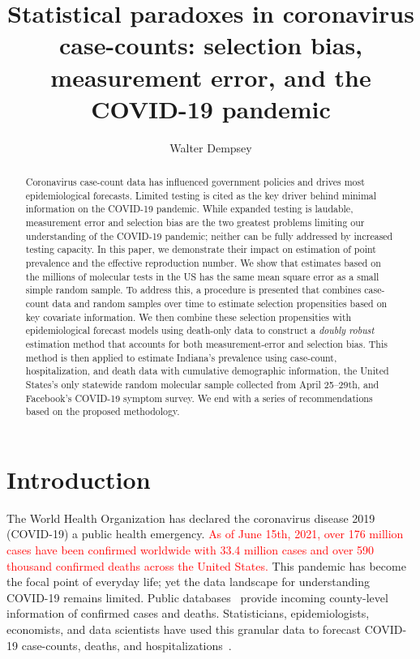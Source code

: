 \documentclass[11pt]{amsart}
\numberwithin{equation}{section}
\theoremstyle{plain}
\begin{document}
\title[Statistical paradoxes in coronavirus case-counts]{Statistical paradoxes in coronavirus case-counts: selection bias, measurement error, and the COVID-19 pandemic} %

\author{Walter Dempsey}
\address{Department of Biostatistics, University of Michigan, Ann Arbor, MI 48109}

\begin{abstract}
  Coronavirus case-count data has influenced government policies and drives most epidemiological forecasts. Limited testing is cited as the key driver behind minimal information on the COVID-19 pandemic. While expanded testing is laudable, measurement error and selection bias are the two greatest problems limiting our understanding of the COVID-19 pandemic; neither can be fully addressed by increased testing capacity. In this paper, we demonstrate their impact on estimation of point prevalence and the effective reproduction number. We show that estimates based on the millions of molecular tests in the US has the same mean square error as a small simple random sample.  To address this, a procedure is presented that combines case-count data and random samples over time to estimate selection propensities based on key covariate information. We then combine these selection propensities with epidemiological forecast models using death-only data to construct a \emph{doubly robust} estimation method that accounts for both measurement-error and selection bias.  This method is then applied to estimate Indiana's prevalence using case-count, hospitalization, and death data with cumulative demographic information, the United States's only statewide random molecular sample collected from April 25--29th, and Facebook's COVID-19 symptom survey.  We end with a series of recommendations based on the proposed methodology.
\end{abstract}

\maketitle

\newpage


\section{Introduction}
The World Health Organization has declared the coronavirus disease 2019 (COVID-19) a public health emergency.  \textcolor{red}{As of June 15th, 2021, over 176 million cases have been confirmed worldwide with 33.4 million cases and over 590 thousand confirmed deaths across the United States.} This pandemic
has become the focal point of everyday life; yet the data landscape for understanding COVID-19 remains limited.  Public databases~\citep{JHU_Lancet,NYT} provide incoming county-level information of confirmed cases and deaths.  Statisticians, epidemiologists, economists, and data scientists have used this granular data to forecast COVID-19 case-counts, deaths, and hospitalizations~\citep{Giordano2020,Song2020,Ray2020,2020.IHME,Wang2020.03,JTD36385}.
\end{document}
